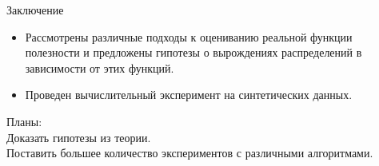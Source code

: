 \documentclass{beamer}
\begin{document}


\begin{frame}{Заключение}
\begin{itemize}
    \item Рассмотрены различные подходы к оцениванию реальной функции полезности и предложены гипотезы о вырождениях распределений в зависимости от этих функций.
    \item Проведен вычислительный эксперимент на синтетических данных.
\end{itemize}

Планы:\\
Доказать гипотезы из теории.\\
Поставить большее количество экспериментов с различными алгоритмами.

    
\end{frame}

\end{document}
